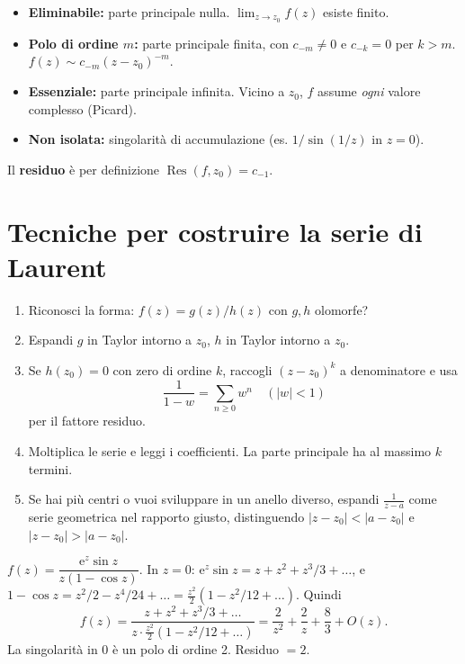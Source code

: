 \documentclass[11pt,a4paper,openany]{book}
\theoremstyle{definition}
\newcommand{\eu}{\mathrm{e}}
\DeclareMathOperator{\Res}{Res}
\begin{document}
\begin{teoria}
\begin{itemize}
\item \textbf{Eliminabile:} parte principale nulla. $\lim_{z\to z_0}f(z)$ esiste finito.
\item \textbf{Polo di ordine $m$:} parte principale finita, con $c_{-m}\neq 0$ e $c_{-k}=0$ per $k>m$. $f(z)\sim c_{-m}(z-z_0)^{-m}$.
\item \textbf{Essenziale:} parte principale infinita. Vicino a $z_0$, $f$ assume \emph{ogni} valore complesso (Picard).
\item \textbf{Non isolata:} singolarit\`a di accumulazione (es. $1/\sin(1/z)$ in $z=0$).
\end{itemize}
Il \textbf{residuo} \`e per definizione $\Res(f,z_0)=c_{-1}$.
\end{teoria}

\section{Tecniche per costruire la serie di Laurent}

\begin{algoritmo}[Laurent in $z_0$]
\begin{enumerate}
\item Riconosci la forma: $f(z)=g(z)/h(z)$ con $g,h$ olomorfe?
\item Espandi $g$ in Taylor intorno a $z_0$, $h$ in Taylor intorno a $z_0$.
\item Se $h(z_0)=0$ con zero di ordine $k$, raccogli $(z-z_0)^k$ a denominatore e usa
$$\frac{1}{1-w}=\sum_{n\ge 0}w^n\quad (|w|<1)$$
per il fattore residuo.
\item Moltiplica le serie e leggi i coefficienti. La parte principale ha al massimo $k$ termini.
\item Se hai pi\`u centri o vuoi sviluppare in un anello diverso, espandi $\frac{1}{z-a}$ come serie geometrica nel rapporto giusto, distinguendo $|z-z_0|<|a-z_0|$ e $|z-z_0|>|a-z_0|$.
\end{enumerate}
\end{algoritmo}

\begin{esempio}[Scritto 20/01/2025, Es. 1]
$f(z)=\dfrac{\eu^z\sin z}{z(1-\cos z)}$. In $z=0$: $\eu^z\sin z=z+z^2+z^3/3+\dots$, e $1-\cos z=z^2/2-z^4/24+\dots=\tfrac{z^2}{2}(1-z^2/12+\dots)$. Quindi
$$f(z)=\frac{z+z^2+z^3/3+\dots}{z\cdot \tfrac{z^2}{2}(1-z^2/12+\dots)}=\frac{2}{z^2}+\frac{2}{z}+\frac{8}{3}+O(z).$$
La singolarit\`a in $0$ \`e un polo di ordine 2. Residuo $=2$.
\end{esempio}
\end{document}
